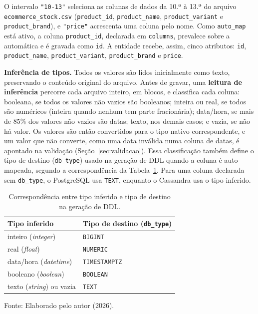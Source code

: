 O intervalo \texttt{"10-13"} seleciona as colunas de dados da 10.ª à 13.ª do arquivo
\texttt{ecommerce\_stock.csv} (\texttt{product\_id}, \texttt{product\_name},
\texttt{product\_variant} e \texttt{product\_brand}), e \texttt{"price"} acrescenta uma
coluna pelo nome. Como \texttt{auto\_map} está ativo, a coluna \texttt{product\_id},
declarada em \texttt{columns}, prevalece sobre a automática e é gravada como
\texttt{id}. A entidade recebe, assim, cinco atributos: \texttt{id},
\texttt{product\_name}, \texttt{product\_variant}, \texttt{product\_brand} e
\texttt{price}.

\textbf{Inferência de tipos.} Todos os valores são lidos inicialmente como texto,
preservando o conteúdo original do arquivo. Antes de gravar, uma \textbf{leitura de
inferência} percorre cada arquivo inteiro, em blocos, e classifica cada coluna: booleana,
se todos os valores não vazios são booleanos; inteira ou real, se todos são numéricos
(inteira quando nenhum tem parte fracionária); data/hora, se mais de 85\% dos valores não
vazios são datas; texto, nos demais casos; e vazia, se não há valor. Os valores são então
convertidos para o tipo nativo correspondente, e um valor que não converte, como uma data
inválida numa coluna de datas, é apontado na validação (Seção~\ref{sec:validacao}).
Essa classificação também define o tipo de destino (\texttt{db\_type}) usado na geração de
DDL quando a coluna é auto-mapeada, segundo a correspondência da
Tabela~\ref{tab:kinds}. Para uma coluna declarada sem \texttt{db\_type}, o PostgreSQL
usa \texttt{TEXT}, enquanto o Cassandra usa o tipo inferido.

\begin{table}[H]
  \caption{Correspondência entre tipo inferido e tipo de destino na geração de DDL.}
  \label{tab:kinds}
  \centering
  \begin{tabular}{l l}
    \toprule
    \textbf{Tipo inferido} & \textbf{Tipo de destino (\texttt{db\_type})} \\
    \midrule
    inteiro (\textit{integer})   & \texttt{BIGINT} \\
    real (\textit{float})        & \texttt{NUMERIC} \\
    data/hora (\textit{datetime}) & \texttt{TIMESTAMPTZ} \\
    booleano (\textit{boolean})  & \texttt{BOOLEAN} \\
    texto (\textit{string}) ou vazia & \texttt{TEXT} \\
    \bottomrule
  \end{tabular}
  \par\vspace{4pt}
  {\footnotesize Fonte: Elaborado pelo autor (2026).}
\end{table}

